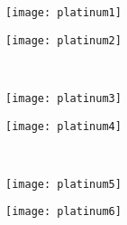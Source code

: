 \documentclass[twoside]{article}
\begin{document}
    \vspace{-.75em}\begin{center}
    \begin{minipage}{0.45\textwidth}\begin{center}\vfill\begin{adjustbox}{max size={!}{0.175\textheight}}\texttt{[image: platinum1]}\end{adjustbox}\vfill\end{center}\end{minipage}
        \hspace{2em}\begin{minipage}{0.45\textwidth}\begin{center}\vfill\begin{adjustbox}{max size={!}{0.175\textheight}}\texttt{[image: platinum2]}\end{adjustbox}\vfill\end{center}\end{minipage}
        \\
            \begin{minipage}{0.45\textwidth}\begin{center}\vfill\begin{adjustbox}{max size={!}{0.175\textheight}}\texttt{[image: platinum3]}\end{adjustbox}\vfill\end{center}\end{minipage}
        \hspace{2em}\begin{minipage}{0.45\textwidth}\begin{center}\vfill\begin{adjustbox}{max size={!}{0.175\textheight}}\texttt{[image: platinum4]}\end{adjustbox}\vfill\end{center}\end{minipage}
        \\
            \begin{minipage}{0.45\textwidth}\begin{center}\vfill\begin{adjustbox}{max size={!}{0.175\textheight}}\texttt{[image: platinum5]}\end{adjustbox}\vfill\end{center}\end{minipage}
        \hspace{2em}\begin{minipage}{0.45\textwidth}\begin{center}\vfill\begin{adjustbox}{max size={!}{0.175\textheight}}\texttt{[image: platinum6]}\end{adjustbox}\vfill\end{center}\end{minipage}

\end{center}
\end{document}
